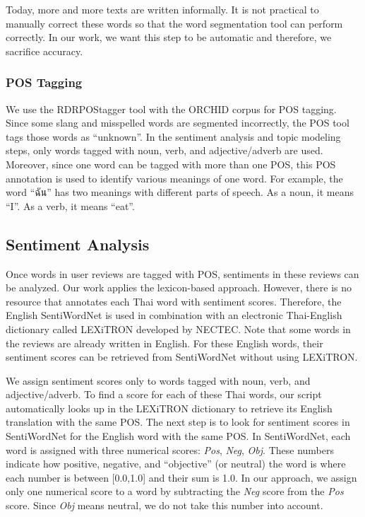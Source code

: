 Today, more and more texts are written informally. It is not practical to manually correct these words so that the word segmentation tool can perform correctly. In our work, we want this step to be automatic and therefore, we sacrifice accuracy. 


\subsubsection{POS Tagging}

We use the RDRPOStagger tool\cite{RDRPOSTagger} with the ORCHID corpus\cite{ORCHID} for POS tagging. Since some slang and misspelled words are segmented incorrectly, the POS tool tags those words as \enquote{unknown}. In the sentiment analysis and topic modeling steps, only words tagged with noun, verb, and adjective/adverb are used. Moreover, since one word can be tagged with more than one POS, this POS annotation is used to identify various meanings of one word. For example, the word \enquote{{ฉัน}} has two meanings with different parts of speech. As a noun, it means \enquote{I}. As a verb, it means \enquote{eat}.

\subsection{Sentiment Analysis}
Once words in user reviews are tagged with POS, sentiments in these reviews can be analyzed. Our work applies the lexicon-based approach. However, there is no resource that annotates each Thai word with sentiment scores. Therefore, the English SentiWordNet \cite{SentiWordNet} is used in combination with an electronic Thai-English dictionary called LEXiTRON \cite{LEXiTRON} developed by NECTEC. Note that some words in the reviews are already written in English. For these English words, their sentiment scores can be retrieved from SentiWordNet without using LEXiTRON.

We assign sentiment scores only to words tagged with noun, verb, and adjective/adverb. To find a score for each of these Thai words, our script automatically looks up in the LEXiTRON dictionary to retrieve its English translation with the same POS. The next step is to look for sentiment scores in SentiWordNet for the English word with the same POS. In SentiWordNet, each word is assigned with three numerical scores: \textit{Pos}, \textit{Neg}, \textit{Obj}. These numbers indicate how positive, negative, and \enquote{objective} (or neutral) the word is where each number is between [0.0,1.0] and their sum is 1.0. In our approach, we assign only one numerical score to a word by subtracting the \textit{Neg} score from the \textit{Pos} score. Since \textit{Obj} means neutral, we do not take this number into account.  

